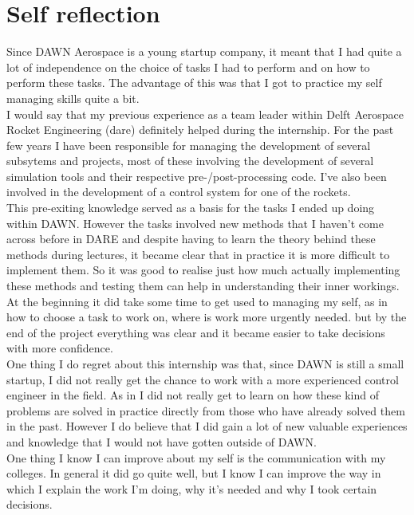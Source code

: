 \chapter{Self reflection}
Since DAWN Aerospace is a young startup company, it meant that I had quite a lot of independence on the choice of tasks I had to perform and on how to perform these tasks. The advantage of this was that I got to practice my self managing skills quite a bit.  \\

I would say that my previous experience as a team leader within Delft Aerospace Rocket Engineering (\gls{dare}) definitely helped during the internship. For the past few years I have been responsible for managing the development of several subsytems and projects, most of these involving the development of several simulation tools and their respective pre-/post-processing code. I've also been involved in the development of a control system for one of the rockets. \\

This pre-exiting knowledge served as a basis for the tasks I ended up doing within DAWN. However the tasks involved new methods that I haven't come across before in DARE and despite having to learn the theory behind these methods during lectures, it became clear that in practice it is more difficult to implement them. So it was good to realise just how much actually implementing these methods and testing them can help in understanding their inner workings. \\

At the beginning it did take some time to get used to managing my self, as in how to choose a task to work on, where is work more urgently needed. but by the end of the project everything was clear and it became easier to take decisions with more confidence. \\

One thing I do regret about this internship was that, since DAWN is still a small startup, I did not really get the chance to work with a more experienced control engineer in the field. As in I did not really get to learn on how these kind of problems are solved in practice directly from those who have already solved them in the past. However I do believe that I did gain a lot of new valuable experiences and knowledge that I would not have gotten outside of DAWN. \\

One thing I know I can improve about my self is the communication with my colleges. In general it did go quite well, but I know I can improve the way in which I explain the work I'm doing, why it's needed and why I took certain decisions. \\

